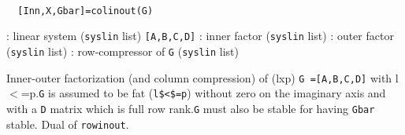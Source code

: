 \begin{mandesc}
   \\ %
\end{mandesc}
\begin{calling_sequence}
\begin{verbatim}
  [Inn,X,Gbar]=colinout(G)  
\end{verbatim}
\end{calling_sequence}
\begin{parameters}
  \begin{varlist}
    : linear system (\verb!syslin! list) \verb![A,B,C,D]!
    :  inner factor (\verb!syslin! list)
    :  outer factor (\verb!syslin! list)
    :  row-compressor of \verb!G! (\verb!syslin! list)
  \end{varlist}
\end{parameters}
\begin{mandescription}
  Inner-outer factorization (and column compression) of (lxp)
  \verb!G =[A,B,C,D]! with l$<$=p.\verb!G! is assumed to be fat (\verb!l$<$=p!)
  without zero on the imaginary axis and with a \verb!D! matrix which is full
  row rank.\verb!G! must also be stable for having \verb!Gbar! stable.  Dual of
  \verb!rowinout!.
\end{mandescription}
\begin{manseealso}
     
\end{manseealso}
